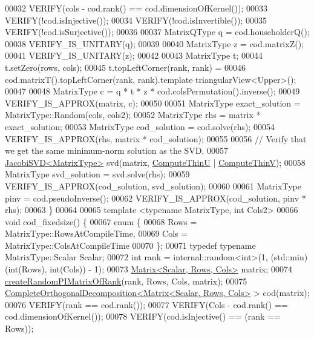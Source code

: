 \begin{DoxyCode}
00032   VERIFY(cols - cod.rank() == cod.dimensionOfKernel());
00033   VERIFY(!cod.isInjective());
00034   VERIFY(!cod.isInvertible());
00035   VERIFY(!cod.isSurjective());
00036 
00037   MatrixQType q = cod.householderQ();
00038   VERIFY\_IS\_UNITARY(q);
00039 
00040   MatrixType z = cod.matrixZ();
00041   VERIFY\_IS\_UNITARY(z);
00042 
00043   MatrixType t;
00044   t.setZero(rows, cols);
00045   t.topLeftCorner(rank, rank) =
00046       cod.matrixT().topLeftCorner(rank, rank).template triangularView<Upper>();
00047 
00048   MatrixType c = q * t * z * cod.colsPermutation().inverse();
00049   VERIFY\_IS\_APPROX(matrix, c);
00050 
00051   MatrixType exact\_solution = MatrixType::Random(cols, cols2);
00052   MatrixType rhs = matrix * exact\_solution;
00053   MatrixType cod\_solution = cod.solve(rhs);
00054   VERIFY\_IS\_APPROX(rhs, matrix * cod\_solution);
00055 
00056   \textcolor{comment}{// Verify that we get the same minimum-norm solution as the SVD.}
00057   \hyperlink{group___s_v_d___module_class_eigen_1_1_jacobi_s_v_d}{JacobiSVD<MatrixType>} svd(matrix, \hyperlink{group__enums_ggae3e239fb70022eb8747994cf5d68b4a9af8c742a1aa87773e165eae406c9ccaf8}{ComputeThinU} | 
      \hyperlink{group__enums_ggae3e239fb70022eb8747994cf5d68b4a9a1055e53fa95c8ae04a07ebb72cfafd95}{ComputeThinV});
00058   MatrixType svd\_solution = svd.solve(rhs);
00059   VERIFY\_IS\_APPROX(cod\_solution, svd\_solution);
00060 
00061   MatrixType pinv = cod.pseudoInverse();
00062   VERIFY\_IS\_APPROX(cod\_solution, pinv * rhs);
00063 \}
00064 
00065 \textcolor{keyword}{template} <\textcolor{keyword}{typename} MatrixType, \textcolor{keywordtype}{int} Cols2>
00066 \textcolor{keywordtype}{void} cod\_fixedsize() \{
00067   \textcolor{keyword}{enum} \{
00068     Rows = MatrixType::RowsAtCompileTime,
00069     Cols = MatrixType::ColsAtCompileTime
00070   \};
00071   \textcolor{keyword}{typedef} \textcolor{keyword}{typename} MatrixType::Scalar Scalar;
00072   \textcolor{keywordtype}{int} rank = internal::random<int>(1, (std::min)(\textcolor{keywordtype}{int}(Rows), int(Cols)) - 1);
00073   \hyperlink{group___core___module_class_eigen_1_1_matrix}{Matrix<Scalar, Rows, Cols>} matrix;
00074   \hyperlink{namespace_eigen_a0d9a7ddcee5c7c8defaba3628455efb2}{createRandomPIMatrixOfRank}(rank, Rows, Cols, matrix);
00075   \hyperlink{group___q_r___module_class_eigen_1_1_complete_orthogonal_decomposition}{CompleteOrthogonalDecomposition<Matrix<Scalar, Rows, Cols>}
       > cod(matrix);
00076   VERIFY(rank == cod.rank());
00077   VERIFY(Cols - cod.rank() == cod.dimensionOfKernel());
00078   VERIFY(cod.isInjective() == (rank == Rows));

\end{DoxyCode}
